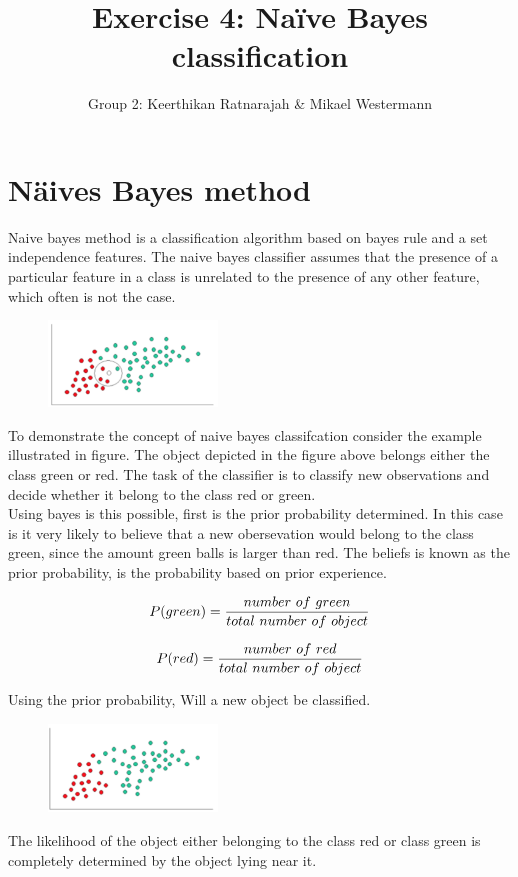 \documentclass[10pt,a4paper]{article}
\title{Exercise 4: Naïve Bayes classification}
\author{Group 2: Keerthikan Ratnarajah \& Mikael Westermann}
\begin{document}
\maketitle

\section{Näives Bayes method}
Naive bayes method is a classification algorithm based on bayes rule and a set independence features. The naive bayes classifier assumes that the presence of a particular feature in a class is unrelated to the presence of any other feature, which often is not the case. 

\begin{figure}[H]
\centering
\includegraphics[width = 0.4\textwidth]{image.png}
\end{figure}


To demonstrate the concept of naive bayes classifcation consider the example illustrated in figure. 
The object depicted in the figure above belongs either the class green or red.  The task of the classifier is to classify new  observations and decide whether it belong to the class red or green. \\

Using bayes is this possible, first is the prior probability determined. In this case is it very likely to believe that a new obersevation would belong to the class green, since the amount green balls is larger than red.  The beliefs is known as the prior probability, is the probability based on prior experience. 

\begin{equation}
\centering
P(green) = \frac{number~of~green}{total~number~of~object}
\end{equation}

\begin{equation}
\centering
P(red) = \frac{number~of~red}{total~number~of~object}
\end{equation}

Using the prior probability, Will  a new object be classified. 

\begin{figure}[H]
\centering
\includegraphics[width = 0.4\textwidth]{image2.png}
\end{figure}
The likelihood of the object either belonging to the class red or class green is completely determined by the object lying near it. 
\end{document}
